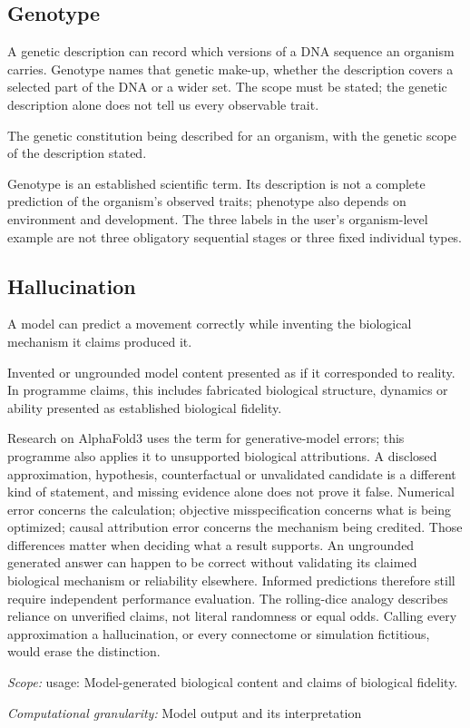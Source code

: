 \subsection*{Genotype}
\noindent A genetic description can record which versions of a DNA sequence an organism carries. Genotype names that genetic make-up, whether the description covers a selected part of the DNA or a wider set. The scope must be stated; the genetic description alone does not tell us every observable trait.\par
\noindent The genetic constitution being described for an organism, with the genetic scope of the description stated.\par
\noindent Genotype is an established scientific term. Its description is not a complete prediction of the organism’s observed traits; phenotype also depends on environment and development. The three labels in the user’s organism-level example are not three obligatory sequential stages or three fixed individual types.\par

\begin{samepage}
\subsection*{Hallucination}
\noindent A model can predict a movement correctly while inventing the biological mechanism it claims produced it.\par
\end{samepage}
\noindent Invented or ungrounded model content presented as if it corresponded to reality. In programme claims, this includes fabricated biological structure, dynamics or ability presented as established biological fidelity.\par
\noindent Research on AlphaFold3 uses the term for generative-model errors; this programme also applies it to unsupported biological attributions. A disclosed approximation, hypothesis, counterfactual or unvalidated candidate is a different kind of statement, and missing evidence alone does not prove it false. Numerical error concerns the calculation; objective misspecification concerns what is being optimized; causal attribution error concerns the mechanism being credited. Those differences matter when deciding what a result supports. An ungrounded generated answer can happen to be correct without validating its claimed biological mechanism or reliability elsewhere. Informed predictions therefore still require independent performance evaluation. The rolling-dice analogy describes reliance on unverified claims, not literal randomness or equal odds. Calling every approximation a hallucination, or every connectome or simulation fictitious, would erase the distinction.\par
\noindent\textit{Scope:} usage: Model-generated biological content and claims of biological fidelity.\par
\begin{samepage}
\noindent\textit{Computational granularity:} Model output and its interpretation\par\nopagebreak[4]

\end{samepage}



